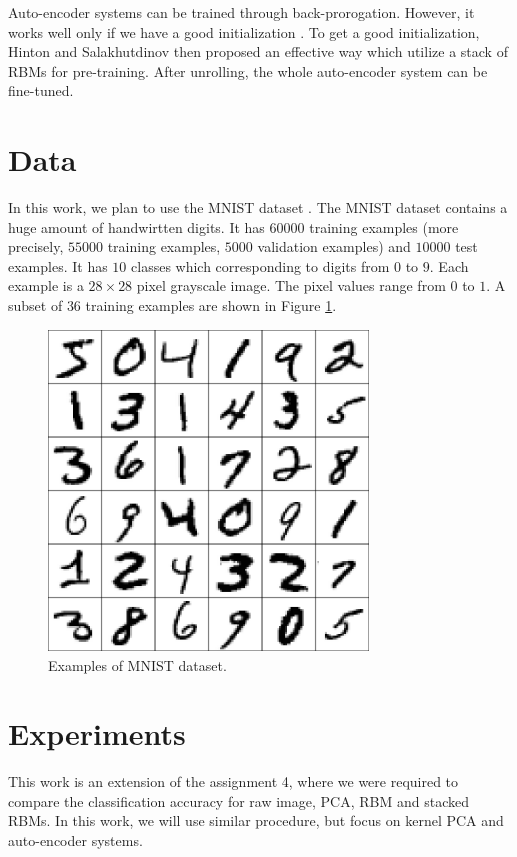 \documentclass{article}
\begin{document}
Auto-encoder systems can be trained through back-prorogation. However, it works well only if we have a good initialization \cite{hinton2006reducing}. To get a good initialization, Hinton and Salakhutdinov \cite{hinton2006reducing} then proposed an effective way which utilize a stack of RBMs for pre-training. After unrolling, the whole auto-encoder system can be fine-tuned.

\section{Data}
\label{sec:data}

In this work, we plan to use the MNIST dataset \cite{lecun1998gradient}. The MNIST dataset contains a huge amount of handwirtten digits. It has $60000$ training examples (more precisely, $55000$ training examples, $5000$ validation examples) and $10000$ test examples. It has $10$ classes which corresponding to digits from $0$ to $9$. Each example is a $28 \times 28$ pixel grayscale image. The pixel values range from $0$ to $1$. A subset of $36$ training examples are shown in Figure \ref{fig:filter}.

\begin{figure}[htb]
\centering
\includegraphics[width=8.5cm]{./figures/filter.pdf}
\caption{Examples of MNIST dataset.}
\label{fig:filter}
\end{figure}

\section{Experiments}
\label{sec:experiment}

This work is an extension of the assignment 4, where we were required to compare the classification accuracy for raw image, PCA, RBM and stacked RBMs. In this work, we will use similar procedure, but focus on kernel PCA and auto-encoder systems.
\end{document}
